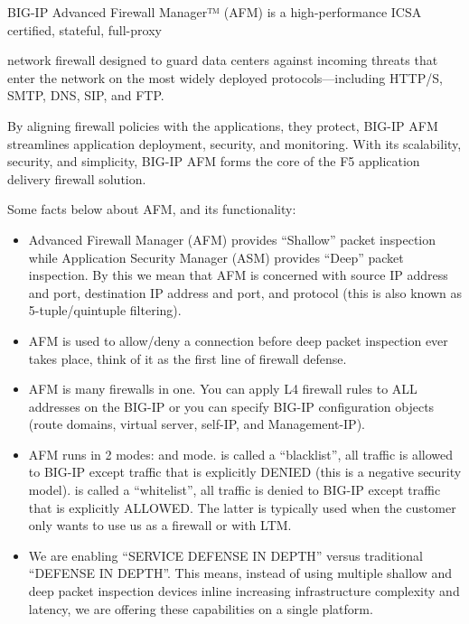 \documentclass[letterpaper,10pt,english]{sphinxmanual}
\begin{document}
BIG-IP Advanced Firewall Manager™ (AFM) is a high-performance ICSA
certified, stateful, full-proxy

network firewall designed to guard data centers against incoming threats
that enter the network on the most widely deployed protocols—including
HTTP/S, SMTP, DNS, SIP, and FTP.

By aligning firewall policies with the applications, they protect,
BIG-IP AFM streamlines application deployment, security, and monitoring.
With its scalability, security, and simplicity, BIG-IP AFM forms the
core of the F5 application delivery firewall solution.


Some facts below about AFM, and its functionality:
\begin{itemize}
\item {} 
Advanced Firewall Manager (AFM) provides “Shallow” packet inspection
while Application Security Manager (ASM) provides “Deep” packet
inspection. By this we mean that AFM is concerned with source IP
address and port, destination IP address and port, and protocol (this
is also known as 5-tuple/quintuple filtering).

\item {} 
AFM is used to allow/deny a connection before deep packet inspection
ever takes place, think of it as the first line of firewall defense.

\item {} 
AFM is many firewalls in one. You can apply L4 firewall rules to ALL
addresses on the BIG-IP or you can specify BIG-IP configuration
objects (route domains, virtual server, self-IP, and Management-IP).

\item {} 
AFM runs in 2 modes:  and  mode.  is called a “blacklist”, all traffic is allowed to BIG-IP
except traffic that is explicitly DENIED (this is a negative security
model).  is called a “whitelist”, all traffic is
denied to BIG-IP except traffic that is explicitly ALLOWED. The
latter is typically used when the customer only wants to use us as a
firewall or with LTM.

\item {} 
We are enabling “SERVICE DEFENSE IN DEPTH” versus traditional
“DEFENSE IN DEPTH”. This means, instead of using multiple shallow and
deep packet inspection devices inline increasing infrastructure
complexity and latency, we are offering these capabilities on a
single platform.


\end{itemize}
\end{document}
